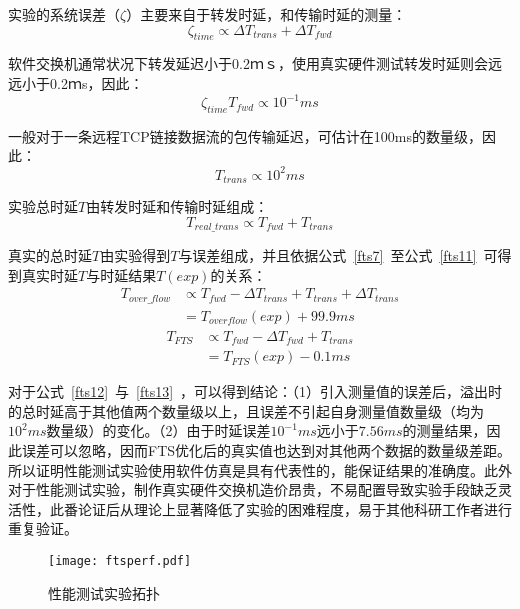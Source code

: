 实验的系统误差（$\zeta$）主要来自于转发时延，和传输时延的测量：
\begin{equation}\label{fts8}
\zeta_{time} \propto \Delta T_{trans} + \Delta T_{fwd}
\end{equation}

软件交换机通常状况下转发延迟小于0.2ｍｓ，使用真实硬件测试转发时延则会远远小于0.2ｍs，因此：
\begin{equation}\label{fts9}
\zeta_{time} T_{fwd} \propto 10^{-1}ms
\end{equation}

一般对于一条远程TCP链接数据流的包传输延迟，可估计在100ms的数量级，因此：
\begin{equation}\label{fts10}
T_{trans} \propto 10^{2}ms
\end{equation}

实验总时延$ T $由转发时延和传输时延组成：
\begin{equation}\label{fts11}
T_{real\_trans} \propto T_{fwd} + T_{trans}
\end{equation}

真实的总时延$T$由实验得到$T$与误差组成，并且依据公式~\ref{fts7}~至公式~\ref{fts11}~可得到真实时延$T$与时延结果$ T(exp) $的关系：
\begin{align}\label{fts12}
T_{over\_flow} &\propto T_{fwd} - \Delta T_{trans} + T_{trans} + \Delta T_{trans}  \nonumber \\
&=T_{overflow}(exp) + 99.9ms
\end{align}
\begin{align}\label{fts13}
T_{FTS} &\propto T_{fwd} - \Delta T_{fwd} + T_{trans} \nonumber \\
&=T_{FTS}(exp) - 0.1ms
\end{align}

对于公式~\ref{fts12}~与~\ref{fts13}~，可以得到结论：（1）引入测量值的误差后，溢出时的总时延高于其他值两个数量级以上，且误差不引起自身测量值数量级（均为$10^2ms$数量级）的变化。（2）由于时延误差$10^{-1}ms $远小于$ 7.56ms$的测量结果，因此误差可以忽略，因而FTS优化后的真实值也达到对其他两个数据的数量级差距。所以证明性能测试实验使用软件仿真是具有代表性的，能保证结果的准确度。此外对于性能测试实验，制作真实硬件交换机造价昂贵，不易配置导致实验手段缺乏灵活性，此番论证后从理论上显著降低了实验的困难程度，易于其他科研工作者进行重复验证。


\begin{figure}[!ht]
	\centering 
	\vspace{-1.5mm} 
	\texttt{[image: ftsperf.pdf]}
	\caption{性能测试实验拓扑} \label{fig:ftsperf}
\end{figure}

